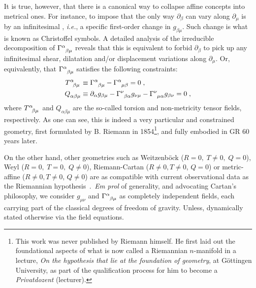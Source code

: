\documentclass[../../main.tex]{subfiles}
\begin{document}
It is true, however, that there is a canonical way to collapse affine concepts into metrical ones. For instance, to impose that the only way $\partial_\beta$ can vary along $\partial_\mu$ is by an infinitesimal , \textit{i.e.}, a specific first-order change in $g_{\beta\mu}$. Such change is what is known as Christoffel symbols. A detailed analysis of the irreducible decomposition of $\tensor{\Gamma}{^\alpha_{\beta\mu}}$ reveals that this is equivalent to forbid $\partial_\beta$ to pick up any infinitesimal shear, dilatation and/or displacement variations along $\partial_\mu$. Or, equivalently, that $\tensor{\Gamma}{^\alpha_{\beta\mu}}$ satisfies the following constraints:
\begin{subequations}\label{eq:vanishing_torsion_nonmetricity}
  \begin{align}
    \tensor{T}{^\alpha_{\beta\mu}} & \equiv \tensor{\Gamma}{^\alpha_{\beta\mu}}-\tensor{\Gamma}{^\alpha_{\mu\beta}} = 0 \label{eq:vanishing_torsion} \;,                                                       \\
    \tensor{Q}{_{\alpha\beta\mu}}  & \equiv \partial_\alpha g_{\beta\mu} -\tensor{\Gamma}{^\nu_{\beta\alpha}}g_{\nu\mu}-\tensor{\Gamma}{^\nu_{\mu\alpha}}g_{\beta\nu} = 0 \label{eq:vanishing_nonmetricity}\;,
  \end{align}
\end{subequations}
where $\tensor{T}{^\alpha_{\beta\mu}}$ and $Q_{\alpha\beta\mu}$ are the so-called torsion and non-metricity tensor fields, respectively. As one can see, this is indeed a very particular and constrained geometry, first formulated by B. Riemann in 1854\footnote{This work was never published by Riemann himself. He first laid out the foundational aspects of what is now called a Riemannian $n$-manifold in a lecture, \textit{On the hypothesis that lie at the foundation of geometry}, at G\"{o}ttingen University, as part of the qualification process for him to become a \textit{Privatdozent} (lecturer).}, and fully embodied in GR 60 years later\@.

On the other hand, other geometries such as Weitzenb\"{o}ck ($R=0, \; T\neq 0, \; Q=0$), Weyl ($R=0, \; T=0, \; Q\neq 0$), Riemann-Cartan  ($R\neq 0, T\neq 0$, $Q=0$) or metric-affine ($R\neq 0, T\neq 0$, $Q\neq 0$) are as compatible with current observational data as the Riemannian hypothesis~\cite{hehl1974,lammerzahl1997,fay2007,capozziello2011,nojiri2011,clifton2012,obukhov2014,broderick2014,berti2015,yagi2016,baker2017,mizuno2018,sunny2019,eht2019,jimenez2019,iosifidis2020,bahamonde2021,cantata2021,lobo2021,ferreira2022,golovnev2022,capozziello2022a}.\ \textit{Em prol} of generality, and advocating Cartan's philosophy, we consider $g_{\mu\nu}$ and $\tensor{\Gamma}{^\alpha_{\beta\mu}}$ as completely independent fields, each carrying part of the classical degrees of freedom of gravity. Unless, dynamically stated otherwise via the field equations.
\end{document}
